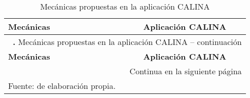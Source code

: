 \begingroup
\small
\renewcommand{\arraystretch}{1.3}
\begin{longtable}{ p{50mm} p{100mm} }
\caption{Mecánicas propuestas en la aplicación CALINA} \label{tab:mecCALINA}\\

\toprule
\textbf{Mecánicas} &  \textbf{Aplicación CALINA}\\ 
\midrule
\endfirsthead

\multicolumn{2}{l}{{\normalsize \textbf{\tablename\ \thetable{}.} Mecánicas propuestas en la aplicación CALINA -- continuación}} \\
\toprule
\textbf{Mecánicas} &  \textbf{Aplicación CALINA}\\ 
\midrule
\endhead

\bottomrule
\multicolumn{2}{r}{{\scriptsize Continua en la siguiente página}} \\
\endfoot

\bottomrule
{\footnotesize Fuente: de elaboración propia.}
\endlastfoot


\end{longtable}
